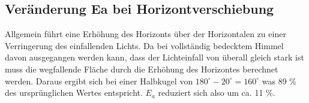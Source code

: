 \subsection{Veränderung Ea bei Horizontverschiebung}

Allgemein führt eine Erhöhung des Horizonts über der Horizontalen zu einer Verringerung des einfallenden Lichts.
Da bei vollständig bedecktem Himmel davon ausgegangen werden kann, dass der Lichteinfall von überall gleich stark ist muss die wegfallende Fläche durch die Erhöhung des Horizontes berechnet werden. Daraus ergibt sich bei einer Halbkugel von $180^{\circ}-20^{\circ}=160^{\circ}$ was 89 \% des ursprünglichen Wertes entspricht. $E_a$ reduziert sich also um ca. 11 \%. 




